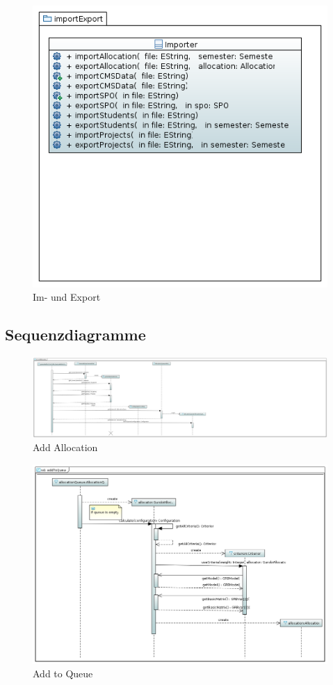 \documentclass[parskip=full]{scrartcl}
\begin{document}
\begin{figure}
\centering
\includegraphics[width=\linewidth]{bilder/importExport.png}
\caption{Im- und Export}
\label{uml:imExport}
\end{figure}


\subsection{Sequenzdiagramme}

\begin{figure}
\centering
\includegraphics[width=\linewidth]{bilder/seqAddAllocation.png}
\caption{Add Allocation}
\label{seq:addAlloction}
\end{figure}

\begin{figure}
\centering
\includegraphics[width=\linewidth]{bilder/seqaddToQueue.png}
\caption{Add to Queue}
\label{seq:addToQueue}
\end{figure}
\end{document}
